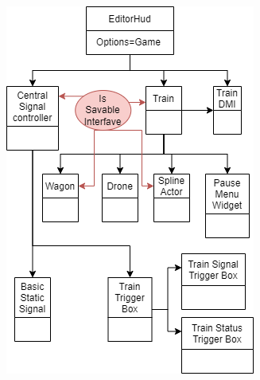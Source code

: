\begin{figure}[H]
\centering
\begin{minipage}{.5\textwidth}
  \centering
  \includegraphics[width=0.95\linewidth]{figures/Untitled Diagram-Game.drawio.png}
  \label{fig:sim_mode}
\end{minipage}%
\begin{minipage}{.5\textwidth}
  \centering

\end{minipage}
\end{figure}
